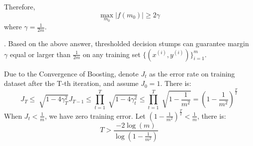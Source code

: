 \documentclass[12pt]{article}
\begin{document}
\par
Therefore,
$$\max_{m_0}\left|f(m_0)\right|\geq2\gamma$$
where $\gamma=\frac{1}{2m}$.
\par
{}. Based on the above answer, thresholded decision
stumps can guarantee margin $\gamma$ equal or larger than $\frac{1}{2m}$ on any training set $\{(x^{(i)}, y^{(i)})\}_{i=1}^m$.
\par
Due to the Convergence of Boosting, denote $J_t$ as the error rate on training dataset after the T-th iteration, and assume $J_0=1$. There is:
$$J_T\leq\sqrt[]{1-4\gamma_T^2}J_{T-1}\leq\prod_{t=1}^T\sqrt[]{1-4\gamma_t^2}\leq\prod_{t=1}^T\sqrt[]{1-\frac{1}{m^2}}=\left(1-\frac{1}{m^2}\right)^{\frac{T}{2}}$$
When $J_t<\frac{1}{m}$, we have zero training error. Let $\left(1-\frac{1}{m^2}\right)^{\frac{T}{2}}<\frac{1}{m}$, there is: 
$$T>\frac{-2\log(m)}{\log\left(1-\frac{1}{m^2}\right)}$$
\end{document}
